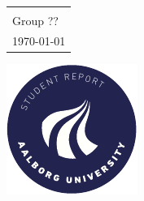 \begin{titlepage}
{{\begin{tabular}{@{}p{\textwidth}@{}}
\begin{center}
    \end{center}
    \vspace{0.5cm}
   \begin{center}
    \vspace{0.5cm}
    {\large
      Computer Engineering \\
      Group ?? \\
      \today 
    }
   \end{center}
   \vspace{0.5cm}
   \begin{center}
    {\Large
      P?? Project
    }
   \end{center}
\end{tabular}}}
  \vfill
  \begin{center}
    \includegraphics[width=0.2\paperwidth]{figures/AAUgraphics/aau_logo_circle_en}%
  \end{center}
\end{titlepage}
\clearpage

